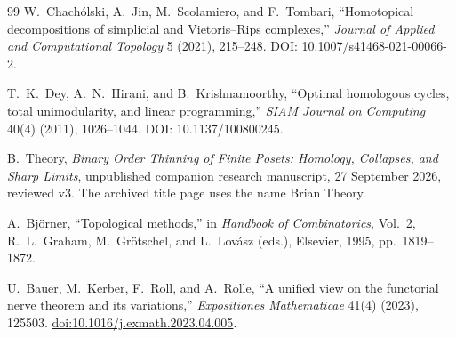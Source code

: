 \documentclass[11pt]{article}
\begin{document}
\begin{thebibliography}{99}
W.~Chach\'olski, A.~Jin, M.~Scolamiero, and F.~Tombari,
``Homotopical decompositions of simplicial and Vietoris--Rips complexes,''
\emph{Journal of Applied and Computational Topology} 5 (2021), 215--248.
DOI: 10.1007/s41468-021-00066-2.

T.~K.~Dey, A.~N.~Hirani, and B.~Krishnamoorthy,
``Optimal homologous cycles, total unimodularity, and linear programming,''
\emph{SIAM Journal on Computing} 40(4) (2011), 1026--1044.
DOI: 10.1137/100800245.

B.~Theory,
\emph{Binary Order Thinning of Finite Posets: Homology, Collapses, and Sharp Limits},
unpublished companion research manuscript, 27 September 2026, reviewed v3.
The archived title page uses the name Brian Theory.

A.~Bj\"orner,
``Topological methods,''
in \emph{Handbook of Combinatorics}, Vol.~2,
R.~L.~Graham, M.~Gr\"otschel, and L.~Lov\'asz (eds.),
Elsevier, 1995, pp.~1819--1872.

U.~Bauer, M.~Kerber, F.~Roll, and A.~Rolle,
``A unified view on the functorial nerve theorem and its variations,''
\emph{Expositiones Mathematicae} 41(4) (2023), 125503.
\href{https://doi.org/10.1016/j.exmath.2023.04.005}{doi:10.1016/j.exmath.2023.04.005}.

\end{thebibliography}
\end{document}
